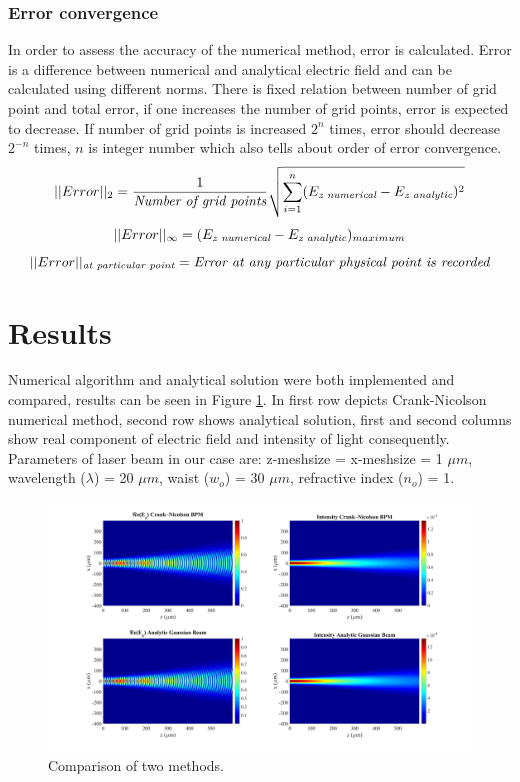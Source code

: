 \documentclass[a4paper]{article}
\begin{document}
	\subsubsection{Error convergence}	
	In order to assess the accuracy of the numerical method, error is calculated. Error is a difference between numerical and analytical electric field and can be calculated using different norms. There is fixed relation between number of grid point and total error, if one increases the number of grid points, error is expected to decrease. If number of grid points is increased $2^n$ times, error should decrease $2^{-n}$ times, $n$ is integer number which also tells about order of error convergence.
	\[||Error||_2 = \frac{1}{\text{{\it Number of grid points}}}\sqrt{\sum\limits_{i=1}^n (E_{\text{\it z numerical}}-E_{\text{\it z analytic}})^2 }
	\]
	\[
	||Error||_\infty = (E_{\text{\it z numerical}}-E_{\text{\it z analytic}})_{maximum}
	\]
	\[ ||Error||_{\text{\it at particular point}} = \text{\it Error at any particular physical point is recorded}
	\]
	\newpage
	\section{Results}
	Numerical algorithm and analytical solution were both implemented and compared, results can be seen in Figure \ref{fig:Results}. In first row depicts Crank-Nicolson numerical method, second row shows analytical solution, first and second columns show real component of electric field and intensity of light consequently. Parameters of laser beam in our case are: z-meshsize = x-meshsize  = 1 $\mu m$, wavelength ($\lambda$) = 20 $\mu m$, waist ($w_o$) = 30 $\mu m$, refractive index ($n_o$) = 1.	
	\begin{figure}[h!]
		\hspace{-30mm}
		\includegraphics[width=1.5\textwidth]{N1.jpg}
		\caption{\label{fig:Results}Comparison of two methods.}
	\end{figure}
\end{document}
